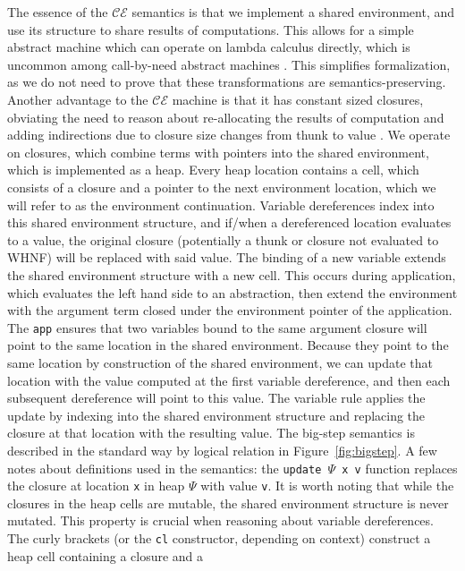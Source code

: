 The essence of the $\mathcal{CE}$ semantics is that we implement a shared
environment, and use its structure to share results of computations. This allows
for a simple abstract machine which can operate on lambda calculus directly,
which is uncommon among call-by-need abstract machines
\cite{jonesstg,launchburynatural,TIM,johnsson1984efficient}. This simplifies
formalization, as we do not need to prove that these transformations are
semantics-preserving. Another advantage to the $\mathcal{CE}$ machine is that it
has constant sized closures, obviating the need to reason about re-allocating
the results of computation and adding indirections due to closure size changes
from thunk to value \cite{jonesstg}. We operate on closures, which combine terms with
pointers into the shared environment, which is implemented as a heap. Every heap
location contains a cell, which consists of a closure and a pointer to the next
environment location, which we will refer to as the environment continuation.
Variable dereferences index into this shared environment structure, and if/when
a dereferenced location evaluates to a value, the original closure (potentially
a thunk or closure not evaluated to WHNF) will be replaced with said value. The
binding of a new variable extends the shared environment structure with a new
cell. This occurs during application, which evaluates the left hand side to an
abstraction, then extend the environment with the argument term closed under the
environment pointer of the application. The \texttt{app} ensures that two
variables bound to the same argument closure will point to the same location in
the shared environment. Because they point to the same location by construction
of the shared environment, we can update that location with the value computed
at the first variable dereference, and then each subsequent dereference will
point to this value. The variable rule applies the update by indexing into the
shared environment structure and replacing the closure at that location with the
resulting value. The big-step semantics is described in the standard way by
logical relation in Figure~\ref{fig:bigstep}. A few notes about definitions used
in the semantics: the \texttt{update $\Psi$ x v} function replaces the closure
at location \texttt{x} in heap $\Psi$ with value \texttt{v}.  It is worth noting
that while the closures in the heap cells are mutable, the shared environment
structure is never mutated.  This property is crucial when reasoning about
variable dereferences.  The curly brackets (or the \texttt{cl} constructor,
depending on context) construct a heap cell containing a closure and a
